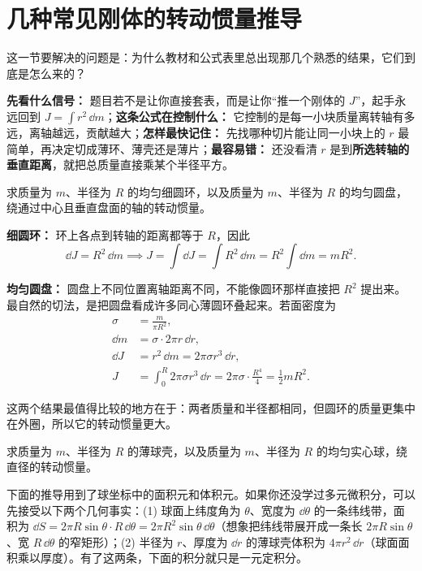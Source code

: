 \documentclass[lang=cn,11pt]{elegantbook}
\newcommand{\bridge}[1]{\begin{note}#1\end{note}}
\begin{document}
\section{几种常见刚体的转动惯量推导}

这一节要解决的问题是：为什么教材和公式表里总出现那几个熟悉的结果，它们到底是怎么来的？

\begin{note}
\textbf{先看什么信号：} 题目若不是让你直接套表，而是让你“推一个刚体的 \(J\)”，起手永远回到 \(J=\int r^2\,\dd m\)；\textbf{这条公式在控制什么：} 它控制的是每一小块质量离转轴有多远，离轴越远，贡献越大；\textbf{怎样最快记住：} 先找哪种切片能让同一小块上的 \(r\) 最简单，再决定切成薄环、薄壳还是薄片；\textbf{最容易错：} 还没看清 \(r\) 是到\textbf{所选转轴的垂直距离}，就把总质量直接乘某个半径平方。
\end{note}

\begin{example}[细圆环与均匀圆盘]
求质量为 \(m\)、半径为 \(R\) 的均匀细圆环，以及质量为 \(m\)、半径为 \(R\) 的均匀圆盘，绕通过中心且垂直盘面的轴的转动惯量。
\end{example}

\begin{solution}
\textbf{细圆环：} 环上各点到转轴的距离都等于 \(R\)，因此
\[
\dd J=R^2\,\dd m
\implies
J=\int \dd J=\int R^2\,\dd m=R^2\int \dd m=mR^2.
\]

\textbf{均匀圆盘：} 圆盘上不同位置离轴距离不同，不能像圆环那样直接把 \(R^2\) 提出来。最自然的切法，是把圆盘看成许多同心薄圆环叠起来。若面密度为
\[
\begin{aligned}
\sigma&=\frac{m}{\pi R^2},\\
\dd m&=\sigma\cdot 2\pi r\,\dd r,\\
\dd J&=r^2\,\dd m=2\pi\sigma r^3\,\dd r,\\
J&=\int_0^R 2\pi\sigma r^3\,\dd r
=2\pi\sigma\cdot \frac{R^4}{4}
=\frac12 mR^2.
\end{aligned}
\]

这两个结果最值得比较的地方在于：两者质量和半径都相同，但圆环的质量更集中在外圈，所以它的转动惯量更大。
\end{solution}

\begin{example}[薄球壳与均匀实心球]
求质量为 \(m\)、半径为 \(R\) 的薄球壳，以及质量为 \(m\)、半径为 \(R\) 的均匀实心球，绕直径的转动惯量。
\end{example}

\bridge{下面的推导用到了球坐标中的面积元和体积元。如果你还没学过多元微积分，可以先接受以下两个几何事实：(1) 球面上纬度角为 \(\theta\)、宽度为 \(\dd\theta\) 的一条纬线带，面积为 \(\dd S=2\pi R\sin\theta\cdot R\,\dd\theta=2\pi R^2\sin\theta\,\dd\theta\)（想象把纬线带展开成一条长 \(2\pi R\sin\theta\)、宽 \(R\,\dd\theta\) 的窄矩形）；(2) 半径为 \(r\)、厚度为 \(\dd r\) 的薄球壳体积为 \(4\pi r^2\,\dd r\)（球面面积乘以厚度）。有了这两条，下面的积分就只是一元定积分。}
\end{document}
